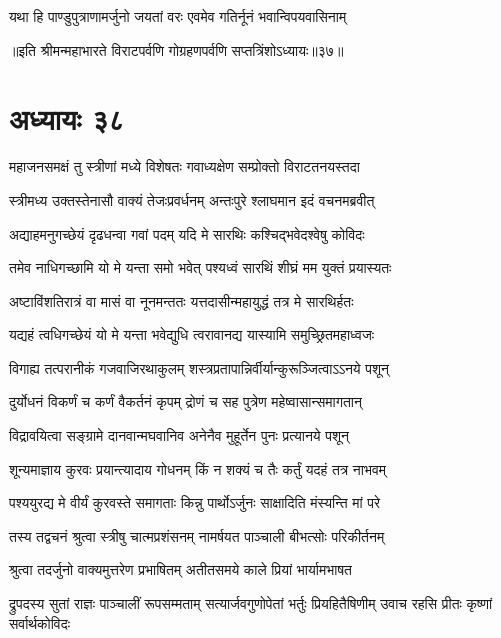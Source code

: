 \twolineshloka
{यथा हि पाण्डुपुत्राणामर्जुनो जयतां वरः}
{एवमेव गतिर्नूनं भवान्विपयवासिनाम्}

॥इति श्रीमन्महाभारते विराटपर्वणि गोग्रहणपर्वणि सप्तत्रिंशोऽध्यायः॥३७॥

\chapter{अध्यायः ३८}

\twolineshloka
{महाजनसमक्षं तु स्त्रीणां मध्ये विशेषतः}
{गवाध्यक्षेण सम्प्रोक्तो विराटतनयस्तदा}


\twolineshloka
{स्त्रीमध्य उक्तस्तेनासौ वाक्यं तेजःप्रवर्धनम्}
{अन्तःपुरे श्लाघमान इदं वचनमब्रवीत्}




\twolineshloka
{अद्याहमनुगच्छेयं दृढधन्वा गवां पदम्}
{यदि मे सारथिः कश्चिद्भवेदश्वेषु कोविदः}


\twolineshloka
{तमेव नाधिगच्छामि यो मे यन्ता समो भवेत्}
{पश्यध्वं सारथिं शीघ्रं मम युक्तं प्रयास्यतः}


\twolineshloka
{अष्टाविंशतिरात्रं वा मासं वा नूनमन्ततः}
{यत्तदासीन्महायुद्धं तत्र मे सारथिर्हतः}


\twolineshloka
{यद्यहं त्वधिगच्छेयं यो मे यन्ता भवेद्युधि}
{त्वरावानद्य यास्यामि समुच्छ्रितमहाध्वजः}


\twolineshloka
{विगाह्य तत्परानीकं गजवाजिरथाकुलम्}
{शस्त्रप्रतापान्निर्वीर्यान्कुरूञ्जित्वाऽऽनये पशून्}


\twolineshloka
{दुर्योधनं विकर्णं च कर्णं वैकर्तनं कृपम्}
{द्रोणं च सह पुत्रेण महेष्वासान्समागतान्}


\twolineshloka
{विद्रावयित्वा सङ्ग्रामे दानवान्मघवानिव}
{अनेनैव मुहूर्तेन पुनः प्रत्यानये पशून्}


\twolineshloka
{शून्यमाज्ञाय कुरवः प्रयान्त्यादाय गोधनम्}
{किं न शक्यं च तैः कर्तुं यदहं तत्र नाभवम्}


\twolineshloka
{पश्ययुरद्य मे वीर्यं कुरवस्ते समागताः}
{किन्नु पार्थोऽर्जुनः साक्षादिति मंस्यन्ति मां परे}




\twolineshloka
{तस्य तद्वचनं श्रुत्वा स्त्रीषु चात्मप्रशंसनम्}
{नामर्षयत पाञ्चाली बीभत्सोः परिकीर्तनम्}


\twolineshloka
{श्रुत्वा तदर्जुनो वाक्यमुत्तरेण प्रभाषितम्}
{अतीतसमये काले प्रियां भार्यामभाषत}


\threelineshloka
{द्रुपदस्य सुतां राज्ञः पाञ्चालीं रूपसम्मताम्}
{सत्यार्जवगुणोपेतां भर्तुः प्रियहितैषिणीम्}
{उवाच रहसि प्रीतः कृष्णां सर्वार्थकोविदः}


